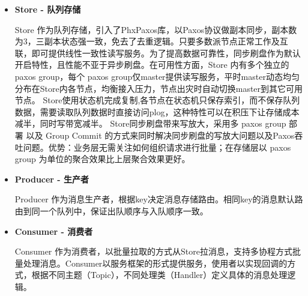 \documentclass{article}
\begin{document}
\begin{itemize}%

\item{}
\textbf{Store - 队列存储}%

  \hspace*{1em}\hspace*{1em}Store 作为队列存储，引入了PhxPaxos库，以Paxos协议做副本同步，副本数为3，三副本状态强一致，免去了去重逻辑。只要多数派节点正常工作及互联，即可提供线性一致性读写服务。为了提高数据可靠性，同步刷盘作为默认开启特性，且性能不亚于异步刷盘。在可用性方面，Store 内有多个独立的 paxos group，每个 paxos group仅master提供读写服务，平时master动态均匀分布在Store内各节点，均衡接入压力，节点出灾时自动切换master到其它可用节点。
\mdbr
{}  \hspace*{1em}\hspace*{1em}Store使用状态机完成复制,各节点在状态机只保存索引，而不保存队列数据，需要读取队列数据时直接访问plog，这种特性可以在积压下让存储成本减半，同时写带宽减半。
\mdbr
{}  \hspace*{1em}\hspace*{1em}Store同步刷盘带来写放大，采用多 paxos group 部署 以及 Group Commit 的方式来同时解决同步刷盘的写放大问题以及Paxos吞吐问题。优势：业务层无需关注如何组织请求进行批量；在存储层以 paxos group 为单位的聚合效果比上层聚合效果更好。

\item{}
\textbf{Producer - 生产者}%

  \hspace*{1em}\hspace*{1em}Producer 作为消息生产者，根据key决定消息存储路由。相同key的消息默认路由到同一个队列中，保证出队顺序与入队顺序一致。%

\item{}
\textbf{Consumer - 消费者}%

  \hspace*{1em}\hspace*{1em}Consumer 作为消费者，以批量拉取的方式从Store拉消息，支持多协程方式批量处理消息。Consumer以服务框架的形式提供服务，使用者以实现回调的方式，根据不同主题（Topic），不同处理类（Handler）定义具体的消息处理逻辑。%


\end{itemize}
\end{document}
